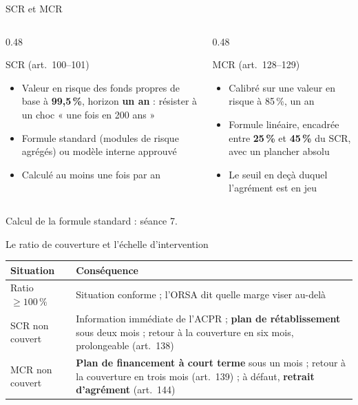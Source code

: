 \documentclass[10pt,aspectratio=169]{beamer}
\begin{document}
\begin{frame}{SCR et MCR}
\begin{columns}[T]
\begin{column}{0.48\textwidth}
\begin{block}{SCR (art.~100--101)}
\begin{itemize}
  \item Valeur en risque des fonds propres de base à \textbf{99,5\,\%}, horizon \textbf{un an} :
        résister à un choc « une fois en 200 ans »
  \item Formule standard (modules de risque agrégés) ou modèle interne approuvé
  \item Calculé au moins une fois par an
\end{itemize}
\end{block}
\end{column}
\begin{column}{0.48\textwidth}
\begin{block}{MCR (art.~128--129)}
\begin{itemize}
  \item Calibré sur une valeur en risque à 85\,\%, un an
  \item Formule linéaire, encadrée entre \textbf{25\,\%} et \textbf{45\,\%} du SCR, avec un plancher absolu
  \item Le seuil en deçà duquel l'agrément est en jeu
\end{itemize}
\end{block}
\end{column}
\end{columns}
\vspace{0.2cm}
\begin{center}\small Calcul de la formule standard : séance 7.\end{center}
\end{frame}

\begin{frame}{Le ratio de couverture et l'échelle d'intervention}
\begin{center}
\end{center}
\begin{table}
\centering
\small
\renewcommand{\arraystretch}{1.4}
\begin{tabular}{p{4.2cm}p{8.3cm}}
\toprule
\textbf{Situation} & \textbf{Conséquence} \\
\midrule
Ratio $\geq 100\,\%$ & Situation conforme ; l'ORSA dit quelle marge viser au-delà \\
SCR non couvert & Information immédiate de l'ACPR ; \textbf{plan de rétablissement} sous deux mois ;
retour à la couverture en six mois, prolongeable (art.~138) \\
MCR non couvert & \textbf{Plan de financement à court terme} sous un mois ; retour à la couverture en
trois mois (art.~139) ; à défaut, \textbf{retrait d'agrément} (art.~144) \\
\bottomrule
\end{tabular}
\end{table}
\end{frame}
\end{document}
